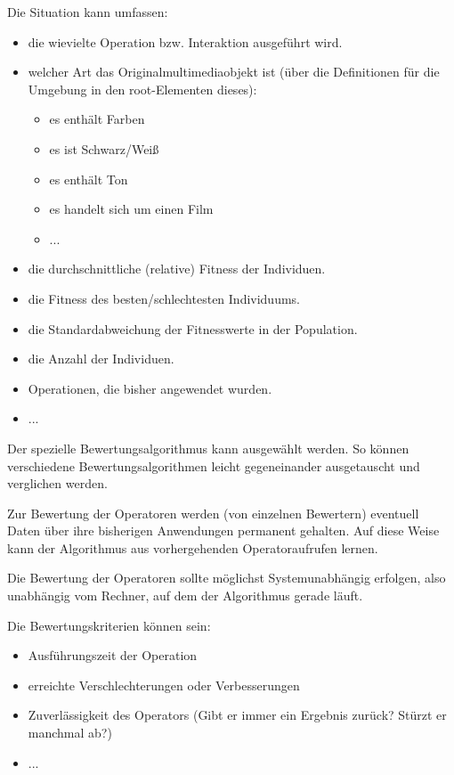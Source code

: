 \bigskip\noindent
Die Situation kann umfassen:
\begin{itemize}
 \item die wievielte Operation bzw. Interaktion ausgeführt wird.
 \item welcher Art das Originalmultimediaobjekt ist (über die Definitionen für die Umgebung in den root-Elementen dieses):
 \begin{itemize}
  \item es enthält Farben 
  \item es ist Schwarz/Weiß
  \item es enthält Ton
  \item es handelt sich um einen Film
  \item ...
 \end{itemize}
 \item die durchschnittliche (relative) Fitness der Individuen.
 \item die Fitness des besten/schlechtesten Individuums.
 \item die Standardabweichung der Fitnesswerte in der Population.
 \item die Anzahl der Individuen.
 \item Operationen, die bisher angewendet wurden.
 \item ...
\end{itemize}

Der spezielle Bewertungsalgorithmus kann ausgewählt werden. So können verschiedene Bewertungsalgorithmen leicht gegeneinander ausgetauscht und verglichen werden.

Zur Bewertung der Operatoren werden (von einzelnen Bewertern) eventuell Daten über ihre bisherigen Anwendungen permanent gehalten. Auf diese Weise kann der Algorithmus aus vorhergehenden Operatoraufrufen lernen.

Die Bewertung der Operatoren sollte möglichst Systemunabhängig erfolgen, also unabhängig vom Rechner, auf dem der Algorithmus gerade läuft.

\bigskip\noindent
Die Bewertungskriterien können sein:
\begin{itemize}
 \item Ausführungszeit der Operation
 \item erreichte Verschlechterungen oder Verbesserungen
 \item Zuverlässigkeit des Operators (Gibt er immer ein Ergebnis zurück? Stürzt er manchmal ab?)
 \item ...
\end{itemize}


